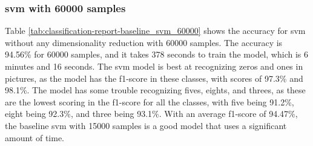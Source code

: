 \subsubsection{\gls{svm} with 60000 samples}\label{subsubsec:experiment-1-results-svm-60000}
Table \ref{tab:classification-report-baseline_svm_60000} shows the accuracy for \gls{svm} without any dimensionality reduction with 60000 samples. The accuracy is 94.56\% for 60000 samples, and it takes 378 seconds to train the model, which is 6 minutes and 16 seconds. The \gls{svm} model is best at recognizing zeros and ones in pictures, as the model has the f1-score in these classes, with scores of 97.3\% and 98.1\%. The model has some trouble recognizing fives, eights, and threes, as these are the lowest scoring in the f1-score for all the classes, with five being 91.2\%, eight being 92.3\%, and three being 93.1\%. With an average f1-score of 94.47\%, the baseline \gls{svm} with 15000 samples is a good model that uses a significant amount of time.

